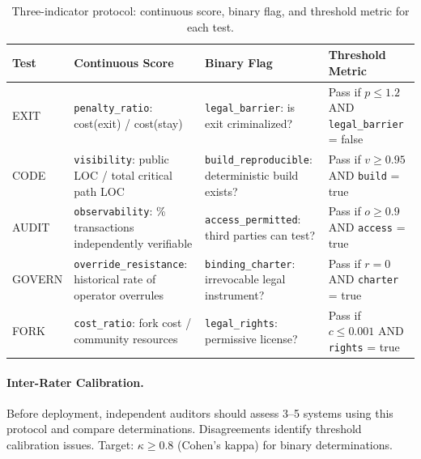 \documentclass{article}
\begin{document}
\begin{table}[htbp]
\centering
\small
\caption{Three-indicator protocol: continuous score, binary flag, and threshold metric for each test.}
\label{tab:three-indicator-main}
\begin{tabular}{@{}lp{3.2cm}p{3.2cm}p{3.5cm}@{}}
\toprule
\textbf{Test} & \textbf{Continuous Score} & \textbf{Binary Flag} & \textbf{Threshold Metric} \\
\midrule
EXIT & \texttt{penalty\_ratio}: cost(exit) / cost(stay) & \texttt{legal\_barrier}: is exit criminalized? & Pass if $p \leq 1.2$ AND \texttt{legal\_barrier} = false \\
CODE & \texttt{visibility}: public LOC / total critical path LOC & \texttt{build\_reproducible}: deterministic build exists? & Pass if $v \geq 0.95$ AND \texttt{build} = true \\
AUDIT & \texttt{observability}: \% transactions independently verifiable & \texttt{access\_permitted}: third parties can test? & Pass if $o \geq 0.9$ AND \texttt{access} = true \\
GOVERN & \texttt{override\_resistance}: historical rate of operator overrules & \texttt{binding\_charter}: irrevocable legal instrument? & Pass if $r = 0$ AND \texttt{charter} = true \\
FORK & \texttt{cost\_ratio}: fork cost / community resources & \texttt{legal\_rights}: permissive license? & Pass if $c \leq 0.001$ AND \texttt{rights} = true \\
\bottomrule
\end{tabular}
\end{table}

\paragraph{Inter-Rater Calibration.} Before deployment, independent auditors should assess 3--5 systems using this protocol and compare determinations. Disagreements identify threshold calibration issues. Target: $\kappa \geq 0.8$ (Cohen's kappa) for binary determinations.
\end{document}
